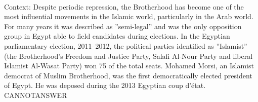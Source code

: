 \documentclass[11pt,a4paper, onecolumn]{article}
\begin{document}
\\ Context: Despite periodic repression, the Brotherhood has become one of the most influential movements in the Islamic world, particularly in the Arab world. For many years it was described as ''semi-legal'' and was the only opposition group in Egypt able to field candidates during elections. In the Egyptian parliamentary election, 2011–2012, the political parties identified as ''Islamist'' (the Brotherhood's Freedom and Justice Party, Salafi Al-Nour Party and liberal Islamist Al-Wasat Party) won 75  of the total seats. Mohamed Morsi, an Islamist democrat of Muslim Brotherhood, was the first democratically elected president of Egypt. He was deposed during the 2013 Egyptian coup d'état. CANNOTANSWER
\end{document}
